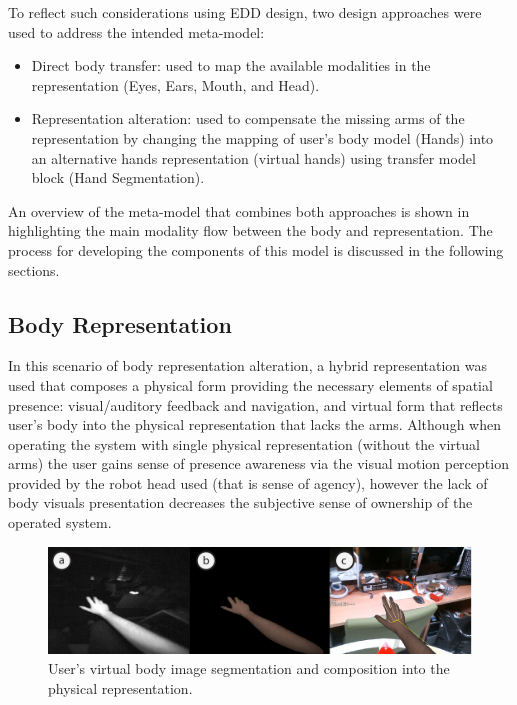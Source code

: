 To reflect such considerations using EDD design, two design approaches were used to address the intended meta-model: 
\begin{itemize}
    \item Direct body transfer: used to map the available modalities in the representation (Eyes, Ears, Mouth, and Head).
    \item Representation alteration: used to compensate the missing arms of the representation by changing the mapping of user's body model (Hands) into an alternative hands representation (virtual hands) using transfer model block (Hand Segmentation).
\end{itemize}

An overview of the meta-model that combines both approaches is shown in  highlighting the main modality flow between the body and representation. The process for developing the components of this model is discussed in the following sections.

\subsection{Body Representation}

In this scenario of body representation alteration, a hybrid representation was used that composes a physical form providing the necessary elements of spatial presence: visual/auditory feedback and navigation, and virtual form that reflects user's body into the physical representation that lacks the arms. Although when operating the system with single physical representation (without the virtual arms) the user gains sense of presence awareness via the visual motion perception provided by the robot head used (that is sense of agency), however the lack of body visuals presentation decreases the subjective sense of ownership of the operated system. 

\begin{figure}[b!]
  \centering
  \captionsetup{justification=centering}
  \includegraphics[width=1\linewidth]{figures/eval/ET/HandsVisual.pdf}
  \caption{User's virtual body image segmentation and composition into the physical representation.}
  \label{fig:eval-ET-hands}
\end{figure}

